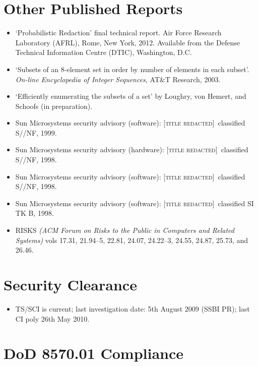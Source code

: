 \documentclass[letterpaper]{article}
\newcommand{\redacted}{\textsc{[title redacted]}}
\begin{document}
\section*{Other Published Reports}

\begin{itemize}
	\item `Probabilistic Redaction' final technical report. Air Force Research
		Laboratory (AFRL), Rome, New York, 2012.  Available from the Defense Technical
		Information Centre (DTIC), Washington, D.C.

	\item `Subsets of an 8-element set in order by number of elements in each
		subset'. \emph{On-line Encyclopedia of Integer Sequences}, AT\&T Research, 2003.

	\item `Efficiently enumerating the subsets of a set' by Loughry, von Hemert,
		and Schoofs (in preparation).

    \item Sun Microsystems security advisory (software): \redacted\ classified S//NF, 1999.
	\item Sun Microsystems security advisory (hardware): \redacted\ classified S//NF, 1998.
	\item Sun Microsystems security advisory (software): \redacted\ classified S//NF, 1998.
	\item Sun Microsystems security advisory (software): \redacted\ classified SI TK B, 1998.

    \item RISKS \emph{(ACM Forum on Risks to the Public in Computers
    and Related Systems)} vols 17.31, 21.94--5, 22.81, 24.07,
    24.22--3, 24.55, 24.87, 25.73, and 26.46.
\end{itemize}

\section*{Security Clearance}

\begin{itemize}
	\item TS/SCI is current; last investigation date: 5th August 2009 (SSBI PR);
		last CI poly 26th May 2010.
\end{itemize}

\section*{DoD 8570.01 Compliance}
\end{document}
